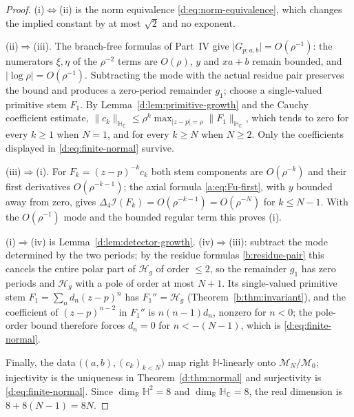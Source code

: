 \documentclass[11pt,a4paper]{article}
\numberwithin{equation}{section}
\theoremstyle{definition}
\theoremstyle{remark}
\theoremstyle{plain}
\newcommand{\HH}{\mathbb H}
\newcommand{\HC}{\mathbb H_{\mathbb C}}
\newcommand{\RR}{\mathbb R}
\newcommand{\lap}{\Delta_4}
\newcommand{\I}{\mathcal I}
\newcommand{\Hg}{\mathcal H_{g}}      %
\newcommand{\abs}[1]{\lvert #1\rvert}
\newcommand{\norm}[1]{\lVert #1\rVert}
\begin{document}
\begin{proof}
(i)$\Leftrightarrow$(ii) is the norm equivalence
\eqref{d:eq:norm-equivalence}, which changes the implied constant by at
most $\sqrt2$ and no exponent.

(ii)$\Rightarrow$(iii).  The branch-free formulas of Part~IV give
$\abs{G_{p;a,b}}=O(\rho^{-1})$: the numerators $\xi,\eta$ of the
$\rho^{-2}$ terms are $O(\rho)$, $y$ and $xa+b$ remain bounded, and
$\abs{\log\rho}=O(\rho^{-1})$.  Subtracting the mode with the actual
residue pair preserves the bound and produces a zero-period remainder
$g_1$; choose a single-valued primitive stem $F_1$.  By
Lemma~\ref{d:lem:primitive-growth} and the Cauchy coefficient estimate,
$\norm{c_k}_{\HC}\le\rho^{k}\max_{\abs{z-p}=\rho}\norm{F_1}_{\HC}$, which
tends to zero for every $k\ge1$ when $N=1$, and for every $k\ge N$ when
$N\ge2$.  Only the coefficients displayed in \eqref{d:eq:finite-normal}
survive.

(iii)$\Rightarrow$(i).  For $F_k=(z-p)^{-k}c_k$ both stem components are
$O(\rho^{-k})$ and their first derivatives $O(\rho^{-k-1})$; the axial
formula \eqref{a:eq:Fu-first}, with $y$ bounded away from zero, gives
$\lap\I(F_k)=O(\rho^{-k-1})=O(\rho^{-N})$ for $k\le N-1$.  With the
$O(\rho^{-1})$ mode and the bounded regular term this proves (i).

(i)$\Rightarrow$(iv) is Lemma~\ref{d:lem:detector-growth}.
(iv)$\Rightarrow$(iii): subtract the mode determined by the two periods;
by the residue formulas \eqref{b:residue-pair} this cancels the entire
polar part of
$\Hg$ of order $\le2$, so the remainder $g_1$ has zero periods and $\Hg$
with a pole of order at most $N+1$.  Its single-valued primitive stem
$F_1=\sum_nd_n(z-p)^n$ has $F_1''=\Hg$ (Theorem~\ref{b:thm:invariant}),
and the coefficient of
$(z-p)^{n-2}$ in $F_1''$ is $n(n-1)d_n$, nonzero for $n<0$; the pole-order
bound therefore forces $d_n=0$ for $n<-(N-1)$, which is
\eqref{d:eq:finite-normal}.

Finally, the data $\bigl((a,b),(c_k)_{k<N}\bigr)$ map right
$\HH$-linearly onto $\mathcal M_N/\mathcal M_0$; injectivity is the
uniqueness in Theorem~\ref{d:thm:normal} and surjectivity is
\eqref{d:eq:finite-normal}.  Since $\dim_\RR\HH^2=8$ and $\dim_\RR\HC=8$,
the real dimension is $8+8(N-1)=8N$.
\end{proof}
\end{document}
